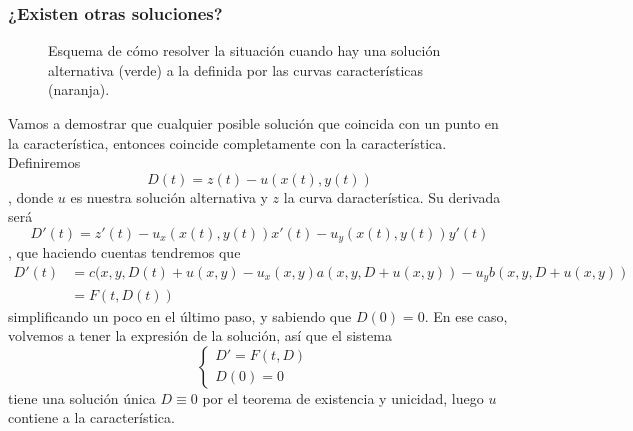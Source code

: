 \subsubsection{¿Existen otras soluciones?}

\begin{figure}[hbtp]
\centering
{}
\caption{Esquema de cómo resolver la situación cuando hay una solución alternativa (verde) a la definida por las curvas características (naranja).}
\label{fig:SolucionesAlternativasCaracteristica}
\end{figure}

Vamos a demostrar que cualquier posible solución que coincida con un punto en la característica, entonces coincide completamente con la característica. Definiremos \[ D(t) = z(t) - u(x(t), y(t))\], donde $u$ es nuestra solución alternativa y $z$ la curva daracterística. Su derivada será \[ D'(t) = z'(t) - u_x(x(t), y(t)) x'(t) - u_y(x(t), y(t)) y'(t)\], que haciendo cuentas tendremos que \begin{align*} D'(t) &= c(x, y, D(t) + u(x,y)-u_x(x,y) a(x,y, D+u(x,y)) - u_yb(x,y, D + u(x,y)) \\
&= F(t, D(t)) %
\end{align*} simplificando un poco en el último paso, y sabiendo que $D(0) = 0$. En ese caso, volvemos a tener la expresión de la solución, así que el sistema \[ \begin{cases} D'= F(t,D) & \\ D(0) = 0 & \end{cases} \] tiene una solución única $D \equiv 0$ por el teorema de existencia y unicidad, luego $u$ contiene a la característica.

















